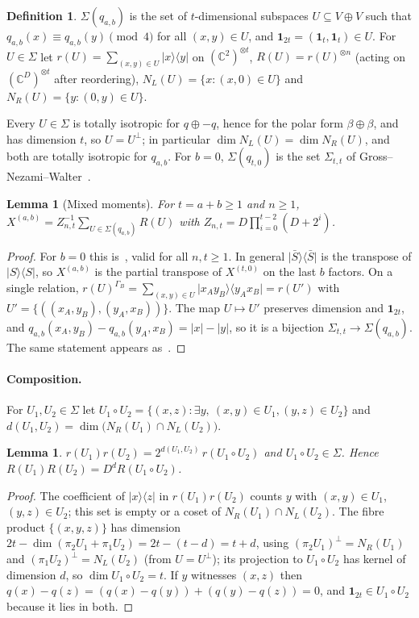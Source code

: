 \documentclass[11pt]{article}
\newcommand{\C}{\mathbb{C}}
\newcommand{\ket}[1]{\lvert #1\rangle}
\newcommand{\bra}[1]{\langle #1\rvert}
\newcommand{\one}{\mathbf 1}
\newtheorem{lemma}[theorem]{Lemma}
\theoremstyle{definition}
\newtheorem{definition}[theorem]{Definition}
\theoremstyle{remark}
\begin{document}
\begin{definition}
$\Sigma(q_{a,b})$ is the set of $t$-dimensional subspaces $U\subseteq V\oplus V$ such that
$q_{a,b}(x)\equiv q_{a,b}(y)\pmod4$ for all $(x,y)\in U$, and $\one_{2t}=(\one_t,\one_t)\in U$. For $U\in\Sigma$ let
$r(U)=\sum_{(x,y)\in U}\ket x\!\bra y$ on $(\C^2)^{\otimes t}$, $R(U)=r(U)^{\otimes n}$ (acting on
$(\C^D)^{\otimes t}$ after reordering), $N_L(U)=\{x:(x,0)\in U\}$ and $N_R(U)=\{y:(0,y)\in U\}$.
\end{definition}

Every $U\in\Sigma$ is totally isotropic for $q\oplus-q$, hence for the polar form $\beta\oplus\beta$, and has
dimension $t$, so $U=U^\perp$; in particular $\dim N_L(U)=\dim N_R(U)$, and both are totally isotropic for $q_{a,b}$.
For $b=0$, $\Sigma(q_{t,0})$ is the set $\Sigma_{t,t}$ of Gross--Nezami--Walter~\cite[Def.~4.1]{GNW2021}.

\begin{lemma}[Mixed moments]\label{lem:moment}
For $t=a+b\ge1$ and $n\ge1$, $X^{(a,b)}=Z_{n,t}^{-1}\sum_{U\in\Sigma(q_{a,b})}R(U)$ with
$Z_{n,t}=D\prod_{i=0}^{t-2}(D+2^i)$.
\end{lemma}
\begin{proof}
For $b=0$ this is~\cite[Thm.~5.3]{GNW2021}, valid for all $n,t\ge1$. In general $\ket{\bar S}\!\bra{\bar S}$ is the
transpose of $\ket S\!\bra S$, so $X^{(a,b)}$ is the partial transpose of $X^{(t,0)}$ on the last $b$ factors. On a
single relation, $r(U)^{\Gamma_B}=\sum_{(x,y)\in U}\ket{x_A y_B}\!\bra{y_A x_B}=r(U')$ with
$U'=\{((x_A,y_B),(y_A,x_B))\}$. The map $U\mapsto U'$ preserves dimension and $\one_{2t}$, and
$q_{a,b}(x_A,y_B)-q_{a,b}(y_A,x_B)=|x|-|y|$, so it is a bijection $\Sigma_{t,t}\to\Sigma(q_{a,b})$. The same statement
appears as~\cite[Lemma~6]{HayashiLu2026}.
\end{proof}

\paragraph{Composition.} For $U_1,U_2\in\Sigma$ let $U_1\circ U_2=\{(x,z):\exists y,\ (x,y)\in U_1,(y,z)\in U_2\}$
and $d(U_1,U_2)=\dim\big(N_R(U_1)\cap N_L(U_2)\big)$.

\begin{lemma}\label{lem:comp}
$r(U_1)r(U_2)=2^{d(U_1,U_2)}\,r(U_1\circ U_2)$ and $U_1\circ U_2\in\Sigma$. Hence $R(U_1)R(U_2)=D^{d}R(U_1\circ U_2)$.
\end{lemma}
\begin{proof}
The coefficient of $\ket x\!\bra z$ in $r(U_1)r(U_2)$ counts $y$ with $(x,y)\in U_1$, $(y,z)\in U_2$; this set is
empty or a coset of $N_R(U_1)\cap N_L(U_2)$. The fibre product $\{(x,y,z)\}$ has dimension
$2t-\dim(\pi_2U_1+\pi_1U_2)=2t-(t-d)=t+d$, using $(\pi_2U_1)^\perp=N_R(U_1)$ and $(\pi_1U_2)^\perp=N_L(U_2)$ (from
$U=U^\perp$); its projection to $U_1\circ U_2$ has kernel of dimension $d$, so $\dim U_1\circ U_2=t$. If $y$ witnesses
$(x,z)$ then $q(x)-q(z)=(q(x)-q(y))+(q(y)-q(z))=0$, and $\one_{2t}\in U_1\circ U_2$ because it lies in both.
\end{proof}
\end{document}
